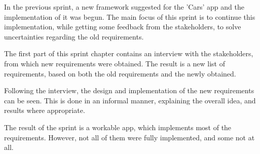 In the previous sprint, a new framework suggested for the 'Cars' app and the implementation of it was begun.
The main focus of this sprint is to continue this implementation, while getting some feedback from the stakeholders, to solve uncertainties regarding the old requirements.

The first part of this sprint chapter contains an interview with the stakeholders, from which new requirements were obtained.
The result is a new list of requirements, based on both the old requirements and the newly obtained.

Following the interview, the design and implementation of the new requirements can be seen.
This is done in an informal manner, explaining the overall idea, and results where appropriate.

The result of the sprint is a workable app, which implements most of the requirements.
However, not all of them were fully implemented, and some not at all.